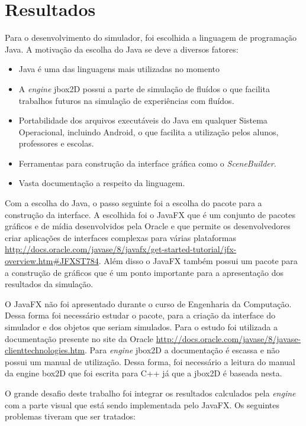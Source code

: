 \chapter{Resultados}

Para o desenvolvimento do simulador, foi escolhida a linguagem de programação Java. A motivação da escolha do Java se deve a diversos fatores:

\begin{itemize}
	\item Java é uma das linguagens mais utilizadas no momento
	\item A \textit{engine} jbox2D possui a parte de simulação de fluídos o que facilita trabalhos futuros na simulação de experiências com fluídos.
	\item Portabilidade dos arquivos executáveis do Java em qualquer Sistema Operacional, incluindo Android, o que facilita a utilização pelos alunos, professores e escolas.
	\item Ferramentas para construção da interface gráfica como o \textit{SceneBuilder}.
	\item Vasta documentação a respeito da linguagem.
\end{itemize}

Com a escolha do Java, o passo seguinte foi a escolha do pacote para a construção da interface. A escolhida foi o JavaFX que é um conjunto de pacotes gráficos e de mídia desenvolvidos pela Oracle e que permite os desenvolvedores criar aplicações de interfaces complexas para várias plataformas \url{http://docs.oracle.com/javase/8/javafx/get-started-tutorial/jfx-overview.htm#JFXST784}. Além disso o JavaFX também possui um pacote para a construção de gráficos que é um ponto importante para a apresentação dos resultados da simulação.

O JavaFX não foi apresentado durante o curso de Engenharia da Computação. Dessa forma foi necessário estudar o pacote, para a criação da interface do simulador e dos objetos que seriam simulados. Para o estudo foi utilizada a documentação presente no site da Oracle \url{http://docs.oracle.com/javase/8/javase-clienttechnologies.htm}. Para \textit{engine} jbox2D a documentação é escassa e não possui um manual de utilização. Dessa forma, foi necessário a leitura do manual da engine box2D que foi escrita para C++ já que a jbox2D é baseada nesta. 

O grande desafio deste trabalho foi integrar os resultados calculados pela \textit{engine} com a parte visual que está sendo implementada pelo JavaFX. Os seguintes problemas tiveram que ser tratados:

